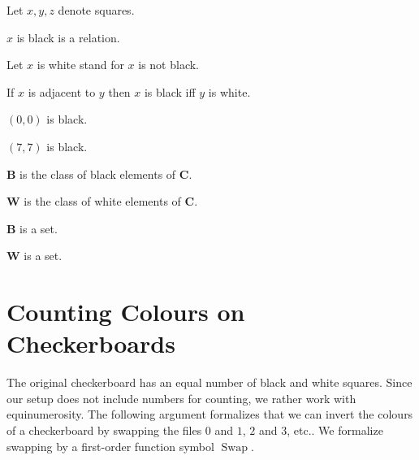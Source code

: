 \documentclass[english]{article}
\newcommand{\Checkerboard}{\mathbf{C}}
\newcommand{\Black}{\mathbf{B}}
\newcommand{\White}{\mathbf{W}}
\newcommand{\Swap}[1]{\operatorname{Swap}#1}
\begin{document}
\begin{forthel}
    Let $x, y, z$ denote squares.

    \begin{signature} $x$ is black is a relation. \end{signature}
    Let $x$ is white stand for $x$ is not black.

    \begin{axiom} If $x$ is adjacent to $y$ then $x$ is black iff $y$ is white. \end{axiom}

    \begin{axiom} $(0,0)$ is black. \end{axiom}
    \begin{axiom} $(7,7)$ is black. \end{axiom}

    \begin{definition} $\Black$ is the class of black elements of $\Checkerboard$. \end{definition}
    \begin{definition} $\White$ is the class of white elements of $\Checkerboard$. \end{definition}

    \begin{lemma} $\Black$ is a set. \end{lemma}
    \begin{lemma} $\White$ is a set. \end{lemma}
\end{forthel}


\section{Counting Colours on Checkerboards}

The original checkerboard has an equal number of black and white squares.
Since our setup does not include numbers for counting, we rather work with
equinumerosity. The following argument formalizes that we can invert the
colours of a checkerboard by swapping the files $0$ and $1$, $2$ and $3$, etc..
We formalize swapping by a first-order function symbol $\Swap{}$.
\end{document}
